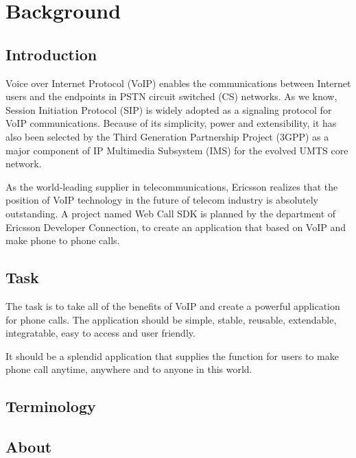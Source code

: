\chapter{Background}
\label{sec:Background}


\section{Introduction}
\label{sec:Background:Introduction}

Voice over Internet Protocol (VoIP)\label{sym:VoIP} enables the communications between Internet users and the endpoints in PSTN circuit switched (CS)\label{sym:CS} networks. As we know, Session Initiation Protocol (SIP) is widely adopted as a signaling protocol for VoIP communications. Because of its simplicity, power and extensibility, it has also been selected by the Third Generation Partnership Project (3GPP)\label{sym:3GPP} as a major component of IP Multimedia Subsystem (IMS)\label{sym:IMS} for the evolved UMTS core network. 

As the world-leading supplier in telecommunications, Ericsson realizes that the position of VoIP technology in the future of telecom industry is absolutely outstanding. A project named Web Call SDK is planned by the department of Ericsson Developer Connection, to create an application that based on VoIP and make phone to phone calls. 

\section{Task}
\label{sec:Introduction:Task}

The task is to take all of the benefits of VoIP and create a powerful application for phone calls. The application should be simple, stable, reusable, extendable, integratable, easy to access and user friendly. 

It should be a splendid application that supplies the function for users to make phone call anytime, anywhere and to anyone in this world.



\section{Terminology}
\label{sec:Terminology}



\clearpage
\section{About}
\label{sec:Introduction:Background:About}

